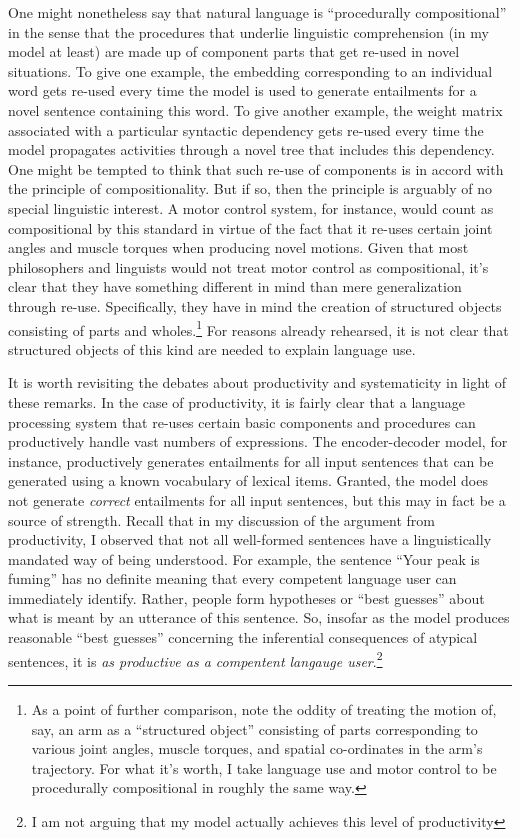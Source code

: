 One might nonetheless say that natural language is ``procedurally compositional'' in the sense that the procedures that underlie linguistic comprehension (in my model at least) are made up of component parts that get re-used in novel situations. To give one example, the embedding corresponding to an individual word gets re-used every time the model is used to generate entailments for a novel sentence containing this word. To give another example, the weight matrix associated with a particular syntactic dependency gets re-used every time the model propagates activities through a novel tree that includes this dependency. One might be tempted to think that such re-use of components is in accord with the principle of compositionality. But if so, then the principle is arguably of no special linguistic interest. A motor control system, for instance, would count as compositional by this standard in virtue of the fact that it re-uses certain joint angles and muscle torques when producing novel motions. Given that most philosophers and linguists would not treat motor control as compositional, it's clear that they have something different in mind than mere generalization through re-use. Specifically, they have in mind the creation of structured objects consisting of parts and wholes.\footnote{As a point of further comparison, note the oddity of treating the motion of, say, an arm as a ``structured object'' consisting of parts corresponding to various joint angles, muscle torques, and spatial co-ordinates in the arm's trajectory. For what it's worth, I take language use and motor control to be procedurally compositional in roughly the same way.} For reasons already rehearsed, it is not clear that structured objects of this kind are needed to explain language use.

It is worth revisiting the debates about productivity and systematicity in light of these remarks. In the case of productivity, it is fairly clear that a language processing system that re-uses certain basic components and procedures can productively handle vast numbers of expressions. The encoder-decoder model, for instance, productively generates entailments for all input sentences that can be generated using a known vocabulary of lexical items. Granted, the model does not generate \textit{correct} entailments for all input sentences, but this may in fact be a source of strength. Recall that in my discussion of the argument from productivity, I observed that not all well-formed sentences have a linguistically mandated way of being understood. For example, the sentence ``Your peak is fuming'' has no definite meaning that every competent language user can immediately identify. Rather, people form hypotheses or ``best guesses'' about what is meant by an utterance of this sentence. So, insofar as the model produces reasonable ``best guesses'' concerning the inferential consequences of atypical sentences, it is \textit{as productive as a compentent langauge user}.\footnote{I am not arguing that my model actually achieves this level of productivity}

